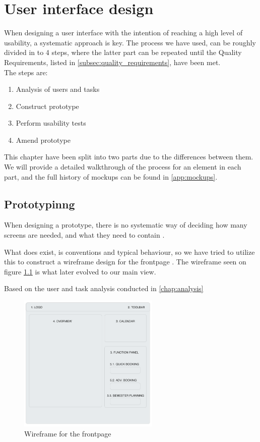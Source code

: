 \chapter{User interface design}
\label{chap:user_interface_design}
When designing a user interface with the intention of reaching a high level of usability, a systematic approach is key. The process we have used, can be roughly divided in to 4 steps, where the latter part can be repeated until the Quality Requirements, listed in \ref{subsec:quality_requirements}, have been met. \cite{lauesen} \\
The steps are:
\begin{enumerate}
\item Analysis of users and tasks
\item Construct prototype
\item Perform usability tests
\item Amend prototype 
\end{enumerate}

This chapter have been split into two parts due to the differences between them. We will provide a detailed walkthrough of the process for an element in each part, and the full history of mockups can be found in \ref{app:mockups}.
\section{Prototypinng}
\label{sec:prototyping}
When designing a prototype, there is no systematic way of deciding how many screens are needed, and what they need to contain \cite{lauesen}.


What does exist, is conventions and typical behaviour, so we have tried to utilize this to construct a wireframe design for the frontpage \cite{garrett}. The wireframe seen on figure \ref{fig:wireframe_frontpage} is what later evolved to our main view.

Based on the user and task analysis conducted in \ref{chap:analysis}

\begin{figure}[htb]
\begin{center}
\leavevmode
\includegraphics[width=0.6\textwidth]{images/wireframe1}
\end{center}
\caption{Wireframe for the frontpage}
\label{fig:wireframe_frontpage}
\end{figure}

